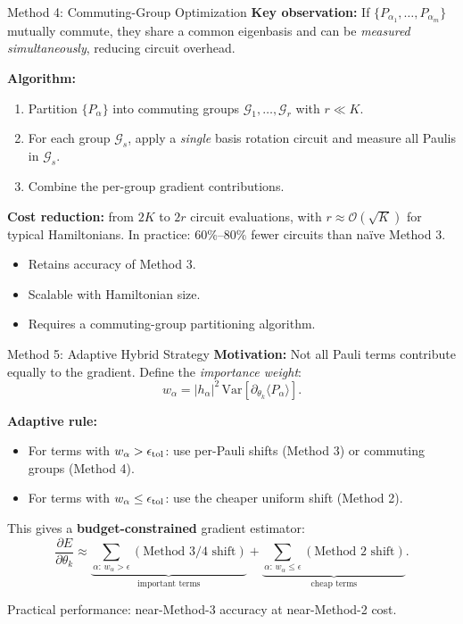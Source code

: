 \documentclass{beamer}
\begin{document}
\begin{frame}{Method 4: Commuting-Group Optimization}
\textbf{Key observation:} If $\{P_{\alpha_1},\dots,P_{\alpha_m}\}$
mutually commute, they share a common eigenbasis and can be
\emph{measured simultaneously}, reducing circuit overhead.

\medskip

\textbf{Algorithm:}
\begin{enumerate}
\item Partition $\{P_\alpha\}$ into commuting groups
  $\mathcal{G}_1,\dots,\mathcal{G}_r$ with $r \ll K$.
\item For each group $\mathcal{G}_s$, apply a \emph{single} basis
  rotation circuit and measure all Paulis in $\mathcal{G}_s$.
\item Combine the per-group gradient contributions.
\end{enumerate}

\medskip

\textbf{Cost reduction:} from $2K$ to $2r$ circuit evaluations,
with $r \approx \mathcal{O}(\sqrt{K})$ for typical Hamiltonians.
In practice: $60\%$--$80\%$ fewer circuits than naïve Method 3.

\medskip

\begin{itemize}
\item[\textbf{+}] Retains accuracy of Method 3.
\item[\textbf{+}] Scalable with Hamiltonian size.
\item[\textbf{--}] Requires a commuting-group partitioning algorithm.
\end{itemize}
\end{frame}


\begin{frame}{Method 5: Adaptive Hybrid Strategy}
\textbf{Motivation:} Not all Pauli terms contribute equally to the
gradient. Define the \emph{importance weight}:
\[
w_\alpha = |h_\alpha|^2\,\mathrm{Var}[\partial_{\theta_k}\langle P_\alpha\rangle].
\]

\textbf{Adaptive rule:}
\begin{itemize}
\item For terms with $w_\alpha > \epsilon_{\rm tol}$: use per-Pauli
  shifts (Method 3) or commuting groups (Method 4).
\item For terms with $w_\alpha \le \epsilon_{\rm tol}$: use the cheaper
  uniform shift (Method 2).
\end{itemize}

This gives a \textbf{budget-constrained} gradient estimator:
\[
\frac{\partial E}{\partial\theta_k}
\approx
\underbrace{\sum_{\alpha:\,w_\alpha>\epsilon}
(\text{Method 3/4 shift})}_{\text{important terms}}
+
\underbrace{\sum_{\alpha:\,w_\alpha\le\epsilon}
(\text{Method 2 shift})}_{\text{cheap terms}}.
\]

Practical performance: near-Method-3 accuracy at near-Method-2 cost.
\end{frame}
\end{document}

